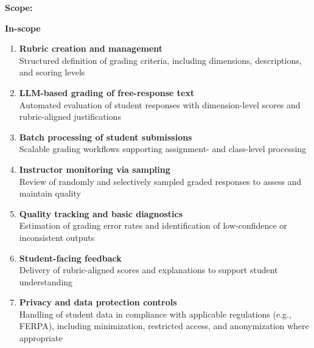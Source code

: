 \documentclass[11pt]{article}
\begin{document}
\textbf{Scope:}

\textbf{In-scope}
\begin{enumerate}[leftmargin=*]
    \item \textbf{Rubric creation and management} \\
    Structured definition of grading criteria, including dimensions, descriptions, and scoring levels
    
    \item \textbf{LLM-based grading of free-response text} \\
    Automated evaluation of student responses with dimension-level scores and rubric-aligned justifications
    
    \item \textbf{Batch processing of student submissions} \\
    Scalable grading workflows supporting assignment- and class-level processing
    
    \item \textbf{Instructor monitoring via sampling} \\
    Review of randomly and selectively sampled graded responses to assess and maintain quality
    
    \item \textbf{Quality tracking and basic diagnostics} \\
    Estimation of grading error rates and identification of low-confidence or inconsistent outputs
    
    \item \textbf{Student-facing feedback} \\
    Delivery of rubric-aligned scores and explanations to support student understanding
    
    \item \textbf{Privacy and data protection controls} \\
    Handling of student data in compliance with applicable regulations (e.g., FERPA), including minimization, restricted access, and anonymization where appropriate
\end{enumerate}
\end{document}
